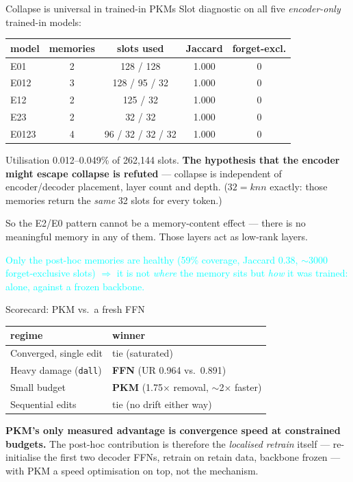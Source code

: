 \documentclass{beamer}
\newcommand{\pierre}[1]{\textcolor{cyan}{#1}}
\begin{document}
\begin{frame}{Collapse is universal in trained-in PKMs}
Slot diagnostic on all five \emph{encoder-only} trained-in models:
\begin{center}
\begin{tabular}{|l|c|c|c|c|}
\hline
model & memories & slots used & Jaccard & forget-excl. \\
\hline
E01   & 2 & 128 / 128         & 1.000 & 0 \\
E012  & 3 & 128 / 95 / 32     & 1.000 & 0 \\
E12   & 2 & 125 / 32          & 1.000 & 0 \\
E23   & 2 & 32 / 32           & 1.000 & 0 \\
E0123 & 4 & 96 / 32 / 32 / 32 & 1.000 & 0 \\
\hline
\end{tabular}
\end{center}

Utilisation 0.012--0.049\% of 262{,}144 slots. \textbf{The hypothesis that the
encoder might escape collapse is refuted} --- collapse is independent of
encoder/decoder placement, layer count and depth. ($32 = knn$ exactly: those
memories return the \emph{same} 32 slots for every token.)

\medskip
\alert{So the E2/E0 pattern cannot be a memory-content effect} --- there is no
meaningful memory in any of them. Those layers act as low-rank layers.

\medskip
\pierre{Only the post-hoc memories are healthy (59\% coverage, Jaccard 0.38,
$\sim$3000 forget-exclusive slots) $\Rightarrow$ it is not \emph{where} the memory
sits but \emph{how} it was trained: alone, against a frozen backbone.}
\end{frame}

\begin{frame}{Scorecard: PKM vs.\ a fresh FFN}
\begin{center}
\begin{tabular}{|l|l|}
\hline
regime & winner \\
\hline
Converged, single edit       & tie (saturated) \\
Heavy damage (\texttt{dall}) & \textbf{FFN} (UR 0.964 vs.\ 0.891) \\
Small budget                 & \textbf{PKM} (1.75$\times$ removal, $\sim$2$\times$ faster) \\
Sequential edits             & tie (no drift either way) \\
\hline
\end{tabular}
\end{center}

\medskip
\textbf{PKM's only measured advantage is convergence speed at constrained
budgets.} The post-hoc contribution is therefore the \emph{localised retrain}
itself --- re-initialise the first two decoder FFNs, retrain on retain data,
backbone frozen --- with PKM a speed optimisation on top, not the mechanism.
\end{frame}
\end{document}
